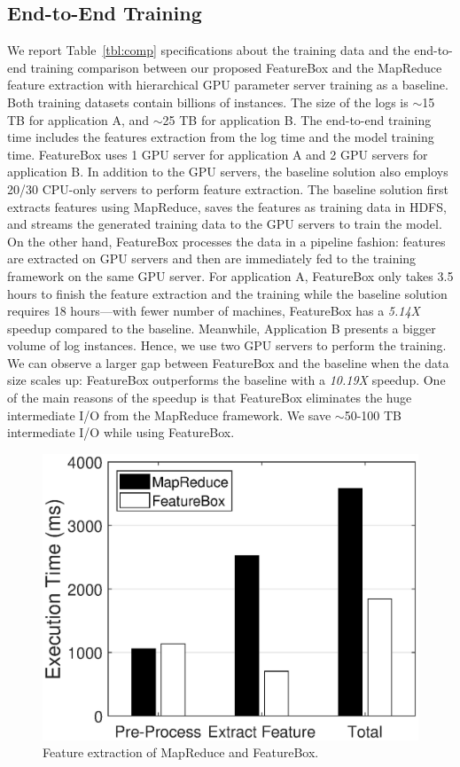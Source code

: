 \documentclass[sigconf]{acmart}
\begin{document}
\subsection{End-to-End Training }
We report Table~\ref{tbl:comp} specifications about the training data and the end-to-end training comparison between our proposed FeatureBox and the MapReduce feature extraction with hierarchical GPU parameter server training as a baseline. Both training datasets contain billions of instances. The size of the logs is $\sim$15 TB for application A, and $\sim$25 TB for application B. The end-to-end training time includes the features extraction from the log time and the model training time. FeatureBox uses 1 GPU server for application A and 2 GPU servers for application B. In addition to the GPU servers, the baseline solution also employs 20/30 CPU-only servers to perform feature extraction. The baseline solution first extracts features using MapReduce, saves the features as training data in HDFS, and streams the generated training data to the GPU servers to train the model. On the other hand, FeatureBox processes the data in a pipeline fashion: features are extracted on GPU servers and then are immediately fed to the training framework on the same GPU server. For application A, FeatureBox only takes 3.5 hours to finish the feature extraction and the training while the baseline solution requires 18 hours---with fewer number of machines, FeatureBox has a \emph{5.14X} speedup compared to the baseline. 
Meanwhile, Application B presents a bigger volume of log instances. Hence, we use two GPU servers to perform the training. We can observe a larger gap between FeatureBox and the baseline when the data size scales up: FeatureBox outperforms the baseline with a \emph{10.19X} speedup. One of the main reasons of the speedup is that FeatureBox eliminates the huge intermediate I/O from the MapReduce framework. 
We save $\sim$50-100 TB intermediate I/O while using FeatureBox.


\begin{figure}[htbp]
\centering
\includegraphics[width=.33\textwidth]{figs/featureextract}
\vspace{-.2cm}
\caption{Feature extraction of MapReduce and FeatureBox.}
\vspace{-.4cm}
\label{fig:extract}
\end{figure}
\end{document}
